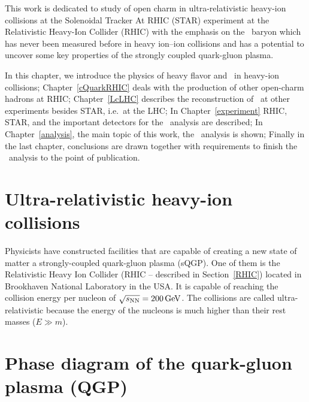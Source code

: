 This work is dedicated to study of open charm in ultra-relativistic heavy-ion collisions at the Solenoidal Tracker At RHIC (STAR) experiment at the Relativistic Heavy-Ion Collider (RHIC) with the emphasis on the \Lambdac\ baryon which has never been measured before in heavy ion--ion collisions and has a potential to uncover some key properties of the strongly coupled quark-gluon plasma.

In this chapter, we introduce the physics of heavy flavor and \Lambdac\ in heavy-ion collisions; Chapter~\ref{cQuarkRHIC} deals with the production of other open-charm hadrons at RHIC\@; Chapter~\ref{LcLHC} describes the reconstruction of \Lambdac\ at other experiments besides STAR, i.e.\ at the LHC\@; In Chapter~\ref{experiment} RHIC, STAR, and the important detectors for the \Lambdac\ analysis are described; In Chapter~\ref{analysis}, the main topic of this work, the \Lambdac\ analysis is shown; Finally in the last chapter, conclusions are drawn together with requirements to finish the \Lambdac\ analysis to the point of publication.

\section{Ultra-relativistic heavy-ion collisions}

Physicists have constructed facilities that are capable of creating a new state of matter a strongly-coupled quark-gluon plasma (sQGP). One of them is the Relativistic Heavy Ion Collider (RHIC -- described in Section~\ref{RHIC}) located in Brookhaven National Laboratory in the USA\@. It is capable of reaching the collision energy per nucleon of $\sqrt{s_\text{NN}}= \SI{200}{\giga\electronvolt}$. The collisions are called ultra-relativistic because the energy of the nucleons is much higher than their rest masses ($E \gg m$).

\section{Phase diagram of the quark-gluon plasma (QGP)}

